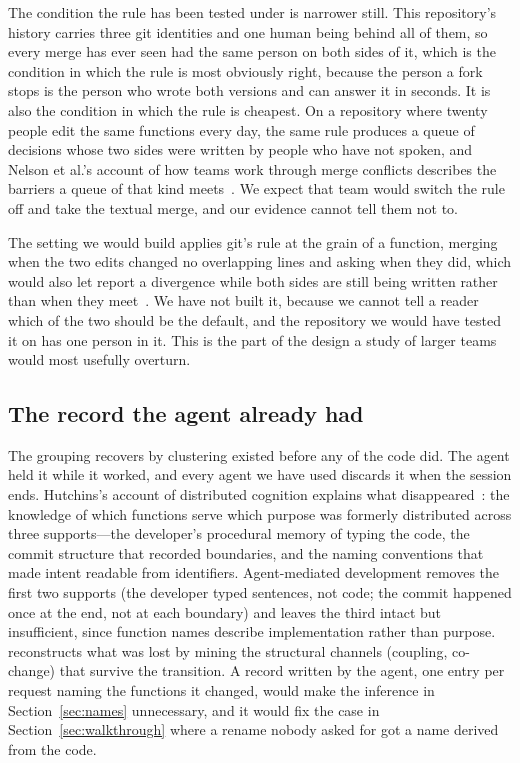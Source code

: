 The condition the rule has been tested under is narrower still. This repository's
history carries three git identities and one human being behind all of them, so
every merge \sgt{} has ever seen had the same person on both sides of it, which is
the condition in which the rule is most obviously right, because the person a fork
stops is the person who wrote both versions and can answer it in seconds. It is
also the condition in which the rule is cheapest. On a repository where twenty
people edit the same functions every day, the same rule produces a queue of
decisions whose two sides were written by people who have not spoken, and Nelson et
al.'s account of how teams work through merge conflicts describes the barriers a
queue of that kind meets~\cite{nelson2019}. We expect that team would switch the
rule off and take the textual merge, and our evidence cannot tell them not to.

The setting we would build applies git's rule at the grain of a function, merging
when the two edits changed no overlapping lines and asking when they did, which
would also let \sgt{} report a divergence while both sides are still being written
rather than when they meet~\cite{guimaraes2012}. We have not built it, because we
cannot tell a reader which of the two should be the default, and the repository we
would have tested it on has one person in it. This is the part of the design a
study of larger teams would most usefully overturn.

\subsection{The record the agent already had}

The grouping \sgt{} recovers by clustering existed before any of the code did. The
agent held it while it worked, and every agent we have used discards it when the
session ends. Hutchins's account of distributed cognition explains what
disappeared~\cite{hutchins1995}: the knowledge of which functions serve which
purpose was formerly distributed across three supports---the developer's
procedural memory of typing the code, the commit structure that recorded
boundaries, and the naming conventions that made intent readable from identifiers.
Agent-mediated development removes the first two supports (the developer typed
sentences, not code; the commit happened once at the end, not at each boundary)
and leaves the third intact but insufficient, since function names describe
implementation rather than purpose. \sgt{} reconstructs what was lost by mining
the structural channels (coupling, co-change) that survive the transition.
A record written by the agent, one entry per request naming the functions it
changed, would make the inference in Section~\ref{sec:names} unnecessary, and it
would fix the case in Section~\ref{sec:walkthrough} where a rename nobody asked
for got a name derived from the code.

